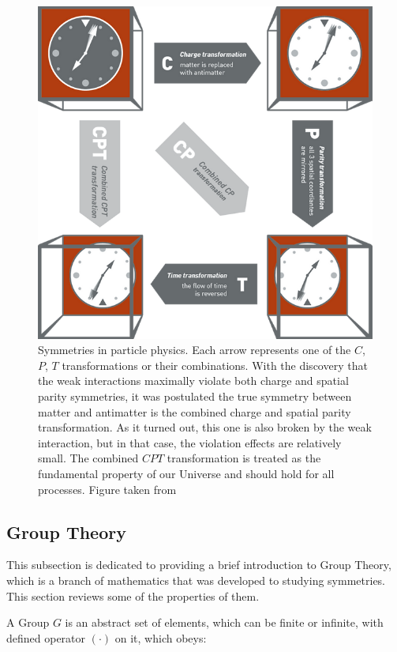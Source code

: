 \begin{figure}
\centering
\includegraphics[scale=1.0]{figures/CPT.png}
\caption{Symmetries in particle physics. Each arrow represents one of the $C$, $P$, $T$ transformations or their combinations. With the discovery that the weak interactions maximally violate both charge and spatial parity symmetries, it was postulated the true symmetry between matter and antimatter is the combined charge and spatial parity transformation. As it turned out, this one is also broken by the weak interaction, but in that case, the violation effects are relatively small. The combined $CPT$ transformation is treated as the fundamental property of our Universe and should hold for all processes. Figure taken from~\cite{CPT}
\label{fig:CPT}}
\end{figure}

\subsection{Group Theory}
This subsection is dedicated to providing a brief introduction to Group Theory, which is a branch of mathematics that was developed to studying symmetries. This section reviews some of the properties of them.

A Group $G$ is an abstract set of elements, which can be finite or infinite, with defined operator $(\cdot)$ on it, which obeys:

